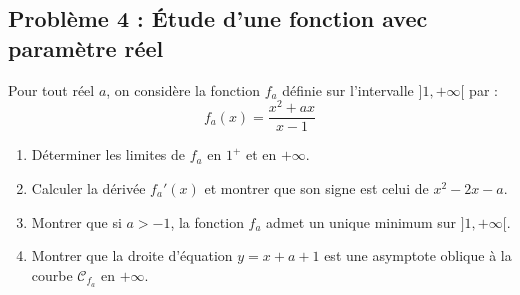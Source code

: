 \subsection*{Problème 4 : Étude d'une fonction avec paramètre réel}
Pour tout réel $a$, on considère la fonction $f_a$ définie sur l'intervalle $]1, +\infty[$ par :
\[
f_a(x) = \frac{x^2 + ax}{x-1}
\]
\begin{enumerate}
    \item Déterminer les limites de $f_a$ en $1^+$ et en $+\infty$.
    \item Calculer la dérivée $f_a'(x)$ et montrer que son signe est celui de $x^2 - 2x - a$.
    \item Montrer que si $a > -1$, la fonction $f_a$ admet un unique minimum sur $]1, +\infty[$.
    \item Montrer que la droite d'équation $y = x + a + 1$ est une asymptote oblique à la courbe $\mathcal{C}_{f_a}$ en $+\infty$.
\end{enumerate}

